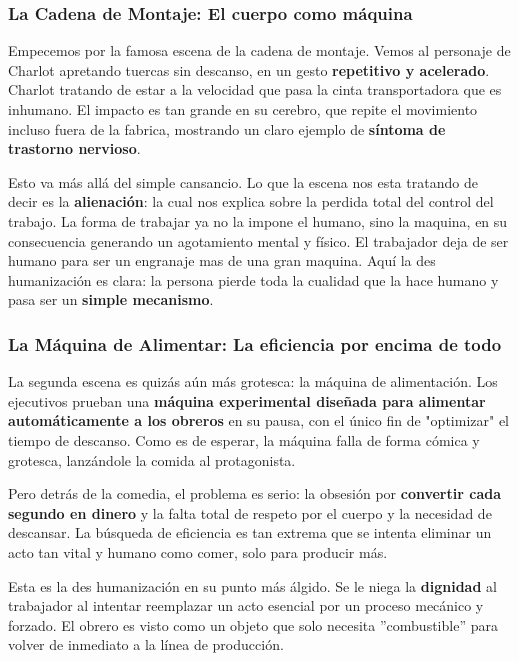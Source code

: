 \documentclass[a4paper,12pt]{article}
\begin{document}
\subsubsection*{La Cadena de Montaje: El cuerpo como máquina}

Empecemos por la famosa escena de la cadena de montaje. Vemos al personaje de Charlot apretando tuercas sin descanso, en un gesto \textbf{repetitivo y acelerado}. Charlot tratando de estar a la velocidad que pasa la cinta transportadora que es inhumano. El impacto es tan grande en su cerebro, que repite el movimiento incluso fuera de la fabrica, mostrando un claro ejemplo de \textbf{síntoma de trastorno nervioso}.
\vspace{3mm}

Esto va más allá del simple cansancio. Lo que la escena nos esta tratando de decir es la \textbf{alienación}: la cual nos explica sobre la perdida total del control del trabajo. La forma de trabajar ya no la impone el humano, sino la maquina, en su consecuencia generando un agotamiento mental y físico. El trabajador deja de ser humano para ser un engranaje mas de una gran maquina. Aquí la des humanización es clara: la persona pierde toda la cualidad que la hace humano y pasa ser un \textbf{simple mecanismo}.

\subsubsection*{La Máquina de Alimentar: La eficiencia por encima de todo}
La segunda escena es quizás aún más grotesca: la máquina de alimentación. Los ejecutivos prueban una \textbf{máquina experimental diseñada para alimentar automáticamente a los obreros} en su pausa, con el único fin de "optimizar" el tiempo de descanso. Como es de esperar, la máquina falla de forma cómica y grotesca, lanzándole la comida al protagonista.

Pero detrás de la comedia, el problema es serio: la obsesión por \textbf{convertir cada segundo en dinero} y la falta total de respeto por el cuerpo y la necesidad de descansar. La búsqueda de eficiencia es tan extrema que se intenta eliminar un acto tan vital y humano como comer, solo para producir más.

Esta es la des humanización en su punto más álgido. Se le niega la \textbf{dignidad} al trabajador al intentar reemplazar un acto esencial por un proceso mecánico y forzado. El obrero es visto como un objeto que solo necesita ''combustible'' para volver de inmediato a la línea de producción.
\end{document}
